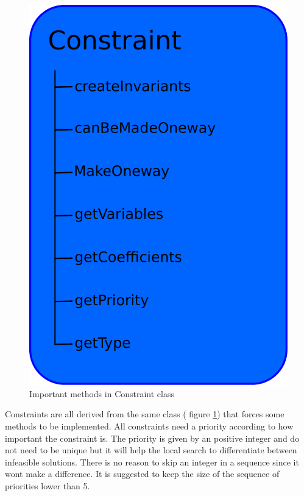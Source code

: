 \begin{figure}[!b]
\centering
\includegraphics[width=\linewidth/2]{constraint.pdf} \caption{Important methods in Constraint 
class}\label{fig_constraint}
\end{figure}
Constraints are all derived from the same class ( figure \ref{fig_constraint}) that forces some 
methods to be implemented. All constraints need a priority according to how important the constraint is. The priority 
is given by an positive integer and do not need to be unique but it will help the local search to differentiate between 
infeasible solutions. There is no reason to skip an integer in a sequence since it wont make a difference. It is 
suggested to keep the size of the sequence of priorities lower than 5. \\
